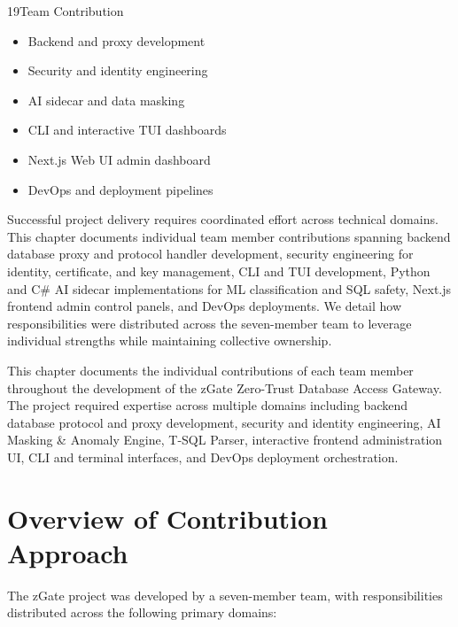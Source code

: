 
\begin{sectionintro}{19}{Team Contribution}{
  \begin{itemize}[leftmargin=1.5em]
    \item Backend and proxy development
    \item Security and identity engineering
    \item AI sidecar and data masking
    \item CLI and interactive TUI dashboards
    \item Next.js Web UI admin dashboard
    \item DevOps and deployment pipelines
  \end{itemize}
}
Successful project delivery requires coordinated effort across technical domains. This chapter documents individual team member contributions spanning backend database proxy and protocol handler development, security engineering for identity, certificate, and key management, CLI and TUI development, Python and C\# AI sidecar implementations for ML classification and SQL safety, Next.js frontend admin control panels, and DevOps deployments. We detail how responsibilities were distributed across the seven-member team to leverage individual strengths while maintaining collective ownership.
\end{sectionintro}

This chapter documents the individual contributions of each team member throughout the development of the zGate Zero-Trust Database Access Gateway. The project required expertise across multiple domains including backend database protocol and proxy development, security and identity engineering, AI Masking \& Anomaly Engine, T-SQL Parser, interactive frontend administration UI, CLI and terminal interfaces, and DevOps deployment orchestration.

\section{Overview of Contribution Approach}

The zGate project was developed by a seven-member team, with responsibilities distributed across the following primary domains:

